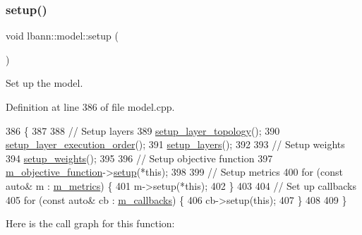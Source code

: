 \subsubsection{\texorpdfstring{setup()}{setup()}}
{\footnotesize\ttfamily void lbann\+::model\+::setup (\begin{DoxyParamCaption}{ }\end{DoxyParamCaption})\hspace{0.3cm}{\ttfamily [virtual]}}

Set up the model. 

Definition at line 386 of file model.\+cpp.


\begin{DoxyCode}
386                   \{
387 
388   \textcolor{comment}{// Setup layers}
389   \hyperlink{classlbann_1_1model_a7b3e2a643c658dcaa7478d2568f29784}{setup\_layer\_topology}();
390   \hyperlink{classlbann_1_1model_ab0e8af146d4121c1b8b04b4a3c2a455c}{setup\_layer\_execution\_order}();
391   \hyperlink{classlbann_1_1model_a989ab581e359f65c9238d627cce5b589}{setup\_layers}();
392 
393   \textcolor{comment}{// Setup weights}
394   \hyperlink{classlbann_1_1model_a582edc0f930e1594381ecc7922e91b08}{setup\_weights}();
395 
396   \textcolor{comment}{// Setup objective function}
397   \hyperlink{classlbann_1_1model_a24c50e7108dd7698671aed7df5b22e8b}{m\_objective\_function}->\hyperlink{classlbann_1_1objective__function_ac14bb274978e0a5182122fd179579878}{setup}(*\textcolor{keyword}{this});
398 
399   \textcolor{comment}{// Setup metrics}
400   \textcolor{keywordflow}{for} (\textcolor{keyword}{const} \textcolor{keyword}{auto}& m : \hyperlink{classlbann_1_1model_ae75c9aafe9e5a93980cc1bbae986bc79}{m\_metrics}) \{
401     m->setup(*\textcolor{keyword}{this});
402   \}
403 
404   \textcolor{comment}{// Set up callbacks}
405   \textcolor{keywordflow}{for} (\textcolor{keyword}{const} \textcolor{keyword}{auto}& cb : \hyperlink{classlbann_1_1model_a07b511fef30368494c2ad80922ffd0eb}{m\_callbacks}) \{
406     cb->setup(\textcolor{keyword}{this});
407   \}
408 
409 \}
\end{DoxyCode}
Here is the call graph for this function\+:\nopagebreak
